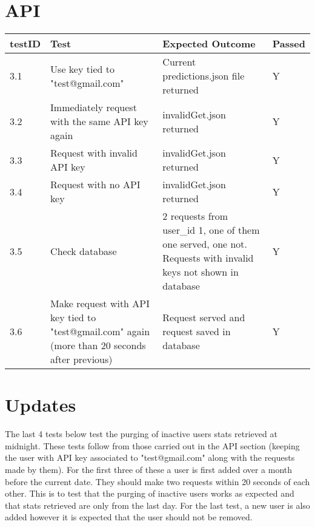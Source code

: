     \section{API}
    \begin{tabular}{|p{1cm}|p{4cm}|p{4cm}|p{2cm}|}
        \hline
        testID & Test & Expected Outcome & Passed\\
        \hline
        3.1 & Use key tied to "test@gmail.com" & Current predictions.json file returned & Y\\
        \hline 
        3.2 & Immediately request with the same API key again & invalidGet.json returned & Y\\ 
        \hline
        3.3 & Request with invalid API key & invalidGet.json returned & Y\\
        \hline
        3.4 & Request with no API key & invalidGet.json returned & Y\\
        \hline
        3.5 & Check database & 2 requests from user\_id 1, one of them one served, one not. Requests with invalid keys not shown in database& Y\\
        \hline
        3.6 & Make request with API key tied to "test@gmail.com" again (more than 20 seconds after previous) & Request served and request saved in database &Y\\
        \hline
    \end{tabular} 

    \section{Updates}
    The last 4 tests below test the purging of inactive users stats retrieved at midnight. These tests follow from those carried out in the API section (keeping the user with API key associated to "test@gmail.com" along with the requests made by them). For the first three of these a user is first added over a month before the current date. They should make two requests within 20 seconds of each other. This is to test that the purging of inactive users works as expected and that stats retrieved are only from the last day. For the last test, a new user is also added however it is expected that the user should not be removed. 

